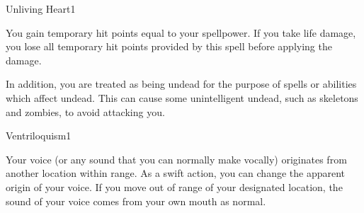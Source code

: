 \begin{spellsection}{Unliving Heart}{1}
    \begin{spellheader}
    \end{spellheader}
    \begin{spellcontent}
        \begin{spelltargetinginfo}
        \end{spelltargetinginfo}
        \begin{spelleffects}
            \spelleffect You gain temporary hit points equal to your spellpower. If you take life damage, you lose all temporary hit points provided by this spell before applying the damage.

            In addition, you are treated as being undead for the purpose of spells or abilities which affect undead. This can cause some unintelligent undead, such as skeletons and zombies, to avoid attacking you.
            \spelldur \durlong
        \end{spelleffects}
    \end{spellcontent}
    \begin{spellfooter}
        \miscastexplode
    \end{spellfooter}
\end{spellsection}

\begin{spellsection}{Ventriloquism}{1}
    \begin{spellheader}
    \end{spellheader}
    \begin{spellcontent}
        \begin{spelltargetinginfo}
            \spellrng{\rngmed}
        \end{spelltargetinginfo}
        \begin{spelleffects}
            \spelleffect Your voice (or any sound that you can normally make vocally) originates from another location within range. As a swift action, you can change the apparent origin of your voice. If you move out of range of your designated location, the sound of your voice comes from your own mouth as normal.
            \spelldur \durshort \dismissable
        \end{spelleffects}
    \end{spellcontent}
    \begin{spellfooter}
        \miscastexplode
    \end{spellfooter}
\end{spellsection}

